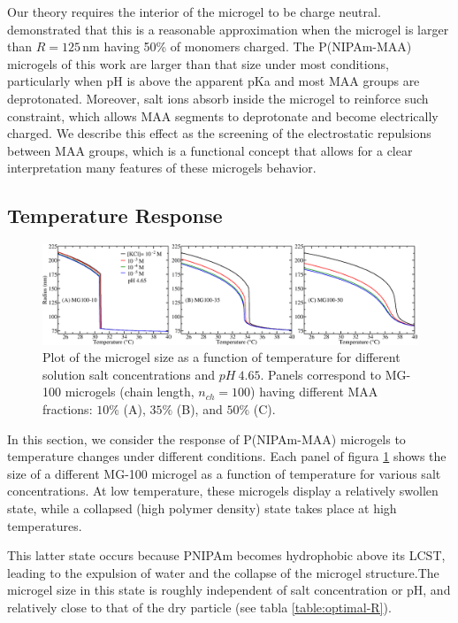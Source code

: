 Our theory requires the interior of the microgel to be charge neutral.
 demonstrated that this is a reasonable approximation when the microgel is larger than $R=125\,\text{nm}$ having 50\% of monomers charged.
The P(NIPAm-MAA) microgels of this work are larger than that size under most conditions, particularly when pH is above the apparent pKa and most MAA groups are deprotonated. 
Moreover, salt ions absorb inside the microgel to reinforce such constraint, which allows MAA segments to deprotonate and become electrically charged.
We describe this effect as the screening of the electrostatic repulsions between MAA groups, which is a functional concept that allows for a clear interpretation many features of these microgels behavior. %

\subsection{Temperature Response}\label{sec:temperature}

\begin{figure}[!htb]
	\centering
	\includegraphics[width=1\linewidth]{Figures/graph-gel/R-T.png}
	\caption{Plot of the microgel size as a function of temperature for different solution salt concentrations and $pH~4.65$.
		Panels correspond to MG-100 microgels (chain length, $n_{ch}=100$) having different MAA fractions: $10\%$ (A), $35\%$ (B), and $50\%$ (C).}
	\label{fig:R-T}
\end{figure}




In this section, we consider the response of P(NIPAm-MAA) microgels to temperature changes under different conditions.
Each panel of figura \ref{fig:R-T} shows the size of a different MG-100 microgel as a function of temperature for various salt concentrations.
At low temperature, these microgels display a relatively swollen state, while a collapsed (high polymer density) state takes place at high temperatures.



This latter state occurs because PNIPAm becomes hydrophobic above its LCST, leading to the expulsion of water and the collapse of the microgel structure.
The microgel size in this state is roughly independent of salt concentration or pH, and relatively close to that of the dry particle (see tabla \ref{table:optimal-R}).


